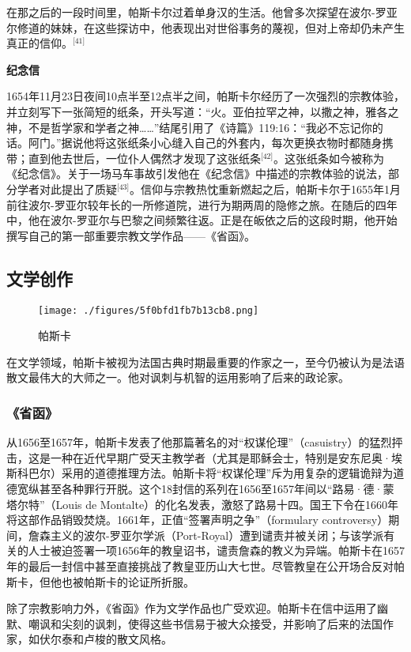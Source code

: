 在那之后的一段时间里，帕斯卡尔过着单身汉的生活。他曾多次探望在波尔-罗亚尔修道的妹妹，在这些探访中，他表现出对世俗事务的蔑视，但对上帝却仍未产生真正的信仰。\(^\text{[41]}\)

\textbf{纪念信}

1654年11月23日夜间10点半至12点半之间，帕斯卡尔经历了一次强烈的宗教体验，并立刻写下一张简短的纸条，开头写道：“火。亚伯拉罕之神，以撒之神，雅各之神，不是哲学家和学者之神……”结尾引用了《诗篇》119:16：“我必不忘记你的话。阿门。”据说他将这张纸条小心缝入自己的外套内，每次更换衣物时都随身携带；直到他去世后，一位仆人偶然才发现了这张纸条\(^\text{[42]}\)。这张纸条如今被称为《纪念信》。关于一场马车事故引发他在《纪念信》中描述的宗教体验的说法，部分学者对此提出了质疑\(^\text{[43]}\)。信仰与宗教热忱重新燃起之后，帕斯卡尔于1655年1月前往波尔-罗亚尔较年长的一所修道院，进行为期两周的隐修之旅。在随后的四年中，他在波尔-罗亚尔与巴黎之间频繁往返。正是在皈依之后的这段时期，他开始撰写自己的第一部重要宗教文学作品——《省函》。
\subsection{文学创作}
\begin{figure}[ht]
\centering
\texttt{[image: ./figures/5f0bfd1fb7b13cb8.png]}
\caption{帕斯卡} \label{fig_BLSpsk_10}
\end{figure}
在文学领域，帕斯卡被视为法国古典时期最重要的作家之一，至今仍被认为是法语散文最伟大的大师之一。他对讽刺与机智的运用影响了后来的政论家。
\subsubsection{《省函》}
从1656至1657年，帕斯卡发表了他那篇著名的对“权谋伦理”（casuistry）的猛烈抨击，这是一种在近代早期广受天主教学者（尤其是耶稣会士，特别是安东尼奥·埃斯科巴尔）采用的道德推理方法。帕斯卡将“权谋伦理”斥为用复杂的逻辑诡辩为道德宽纵甚至各种罪行开脱。这个18封信的系列在1656至1657年间以“路易·德·蒙塔尔特”（Louis de Montalte）的化名发表，激怒了路易十四。国王下令在1660年将这部作品销毁焚烧。1661年，正值“签署声明之争”（formulary controversy）期间，詹森主义的波尔-罗亚尔学派（Port-Royal）遭到谴责并被关闭；与该学派有关的人士被迫签署一项1656年的教皇诏书，谴责詹森的教义为异端。帕斯卡在1657年的最后一封信中甚至直接挑战了教皇亚历山大七世。尽管教皇在公开场合反对帕斯卡，但他也被帕斯卡的论证所折服。

除了宗教影响力外，《省函》作为文学作品也广受欢迎。帕斯卡在信中运用了幽默、嘲讽和尖刻的讽刺，使得这些书信易于被大众接受，并影响了后来的法国作家，如伏尔泰和卢梭的散文风格。

